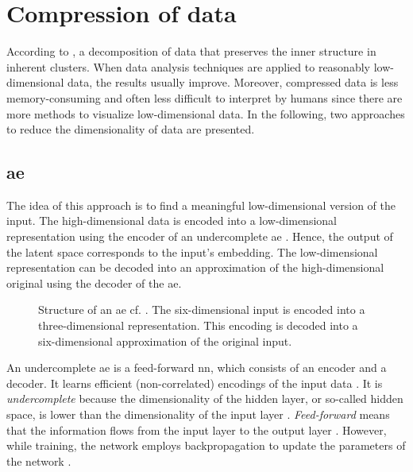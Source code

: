 \section{Compression of data}\label{sec:compression}

According to \citeauthor{clusteringDocs2020}, a decomposition of data that preserves the inner structure in inherent clusters. 
When data analysis techniques are applied to reasonably low-dimensional data, the results usually improve.
Moreover, compressed data is less memory-consuming and often less difficult to interpret by humans 
since there are more methods to visualize low-dimensional data.
In the following, two approaches to reduce the dimensionality of data are presented.

\subsection{\acl*{ae}}\label{subsec:autoencoder}

The idea of this approach is to find a meaningful low-dimensional version of the input.
The high-dimensional data is encoded into a low-dimensional representation using the encoder of an undercomplete \ac{ae} \cite{autoencoder2020}.
Hence, the output of the latent space corresponds to the input's embedding. 
The low-dimensional representation can be decoded into an approximation of the high-dimensional original using the decoder of the \ac{ae}.

\begin{figure}[!htb] %
    \centering
    
    \caption[Structure of an \ac{ae}]
    {Structure of an \acs*{ae} cf. \cite{autoencoder2020}.
    The six-dimensional input is encoded into a three-dimensional representation.
    This encoding is decoded into a six-dimensional approximation of the original input.}
    \label{fig:ae}
\end{figure}

An undercomplete \ac{ae} is a feed-forward \ac{nn}, which consists of an encoder and a decoder.
It learns efficient (non-correlated) encodings of the input data \cite{autoencoder2020}.
It is \textit{undercomplete} because the dimensionality of the hidden layer, or so-called hidden space, 
is lower than the dimensionality of the input layer \cite{seminar_ies}.
\textit{Feed-forward} means that the information flows from the input layer to the output layer \cite{seminar_ies}.
However, while training, the network employs backpropagation to update the parameters of the network \cite{seminar_ies}.

